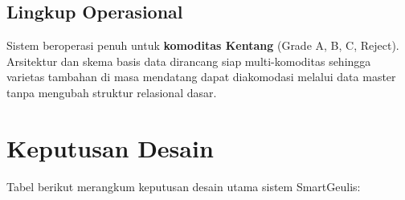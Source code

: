 \documentclass[12pt,a4paper]{article}
\begin{document}
\subsection{Lingkup Operasional}
Sistem beroperasi penuh untuk \textbf{komoditas Kentang} (Grade A, B, C, Reject). Arsitektur dan skema basis data dirancang siap multi-komoditas sehingga varietas tambahan di masa mendatang dapat diakomodasi melalui data master tanpa mengubah struktur relasional dasar.

\section{Keputusan Desain}

Tabel berikut merangkum keputusan desain utama sistem SmartGeulis:
\end{document}
